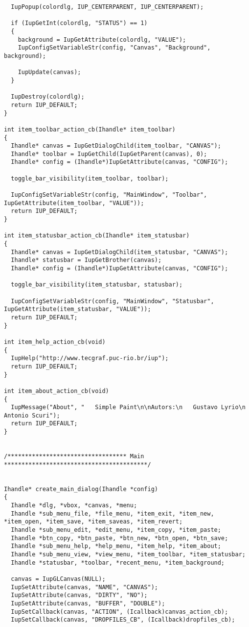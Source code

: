 \documentclass{ctexart}
\begin{document}
\begin{lstlisting}
  IupPopup(colordlg, IUP_CENTERPARENT, IUP_CENTERPARENT);

  if (IupGetInt(colordlg, "STATUS") == 1)
  {
    background = IupGetAttribute(colordlg, "VALUE");
    IupConfigSetVariableStr(config, "Canvas", "Background", background);

    IupUpdate(canvas);
  }

  IupDestroy(colordlg);
  return IUP_DEFAULT;
}

int item_toolbar_action_cb(Ihandle* item_toolbar)
{
  Ihandle* canvas = IupGetDialogChild(item_toolbar, "CANVAS");
  Ihandle* toolbar = IupGetChild(IupGetParent(canvas), 0);
  Ihandle* config = (Ihandle*)IupGetAttribute(canvas, "CONFIG");

  toggle_bar_visibility(item_toolbar, toolbar);

  IupConfigSetVariableStr(config, "MainWindow", "Toolbar", IupGetAttribute(item_toolbar, "VALUE"));
  return IUP_DEFAULT;
}

int item_statusbar_action_cb(Ihandle* item_statusbar)
{
  Ihandle* canvas = IupGetDialogChild(item_statusbar, "CANVAS");
  Ihandle* statusbar = IupGetBrother(canvas);
  Ihandle* config = (Ihandle*)IupGetAttribute(canvas, "CONFIG");

  toggle_bar_visibility(item_statusbar, statusbar);

  IupConfigSetVariableStr(config, "MainWindow", "Statusbar", IupGetAttribute(item_statusbar, "VALUE"));
  return IUP_DEFAULT;
}

int item_help_action_cb(void)
{
  IupHelp("http://www.tecgraf.puc-rio.br/iup");
  return IUP_DEFAULT;
}

int item_about_action_cb(void)
{
  IupMessage("About", "   Simple Paint\n\nAutors:\n   Gustavo Lyrio\n   Antonio Scuri");
  return IUP_DEFAULT;
}


/********************************** Main *****************************************/


Ihandle* create_main_dialog(Ihandle *config)
{
  Ihandle *dlg, *vbox, *canvas, *menu;
  Ihandle *sub_menu_file, *file_menu, *item_exit, *item_new, *item_open, *item_save, *item_saveas, *item_revert;
  Ihandle *sub_menu_edit, *edit_menu, *item_copy, *item_paste;
  Ihandle *btn_copy, *btn_paste, *btn_new, *btn_open, *btn_save;
  Ihandle *sub_menu_help, *help_menu, *item_help, *item_about;
  Ihandle *sub_menu_view, *view_menu, *item_toolbar, *item_statusbar;
  Ihandle *statusbar, *toolbar, *recent_menu, *item_background;

  canvas = IupGLCanvas(NULL);
  IupSetAttribute(canvas, "NAME", "CANVAS");
  IupSetAttribute(canvas, "DIRTY", "NO");
  IupSetAttribute(canvas, "BUFFER", "DOUBLE");
  IupSetCallback(canvas, "ACTION", (Icallback)canvas_action_cb);
  IupSetCallback(canvas, "DROPFILES_CB", (Icallback)dropfiles_cb);


\end{lstlisting}
\end{document}
